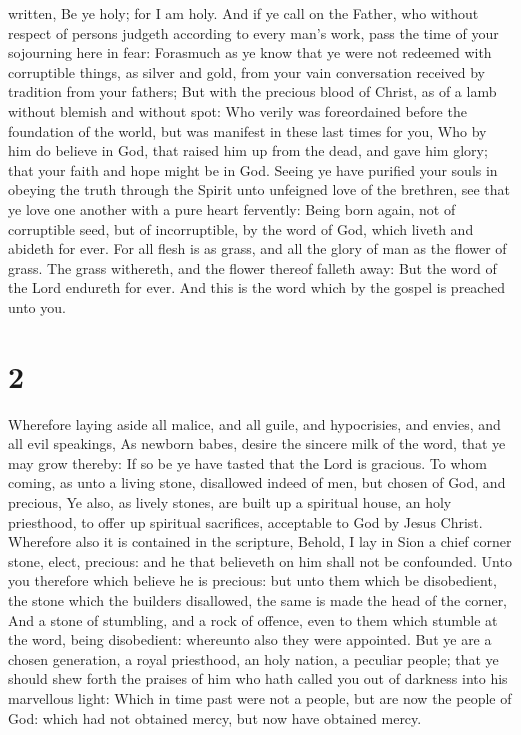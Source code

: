 written, Be ye holy; for I am holy.  And if ye call on the
Father, who without respect of persons judgeth according to every man's
work, pass the time of your sojourning here in fear: 
Forasmuch as ye know that ye were not redeemed with corruptible things,
as silver and gold, from your vain conversation received by tradition
from your fathers;  But with the precious blood of Christ,
as of a lamb without blemish and without spot:  Who verily
was foreordained before the foundation of the world, but was manifest in
these last times for you,  Who by him do believe in God,
that raised him up from the dead, and gave him glory; that your faith
and hope might be in God.  Seeing ye have purified your
souls in obeying the truth through the Spirit unto unfeigned love of the
brethren, see that ye love one another with a pure heart fervently:
 Being born again, not of corruptible seed, but of
incorruptible, by the word of God, which liveth and abideth for ever.
 For all flesh is as grass, and all the glory of man as the
flower of grass. The grass withereth, and the flower thereof falleth
away:  But the word of the Lord endureth for ever. And this
is the word which by the gospel is preached unto you.

\hypertarget{section-1}{%
\section{2}\label{section-1}}

 Wherefore laying aside all malice, and all guile, and
hypocrisies, and envies, and all evil speakings,  As newborn
babes, desire the sincere milk of the word, that ye may grow thereby:
 If so be ye have tasted that the Lord is gracious.
 To whom coming, as unto a living stone, disallowed indeed
of men, but chosen of God, and precious,  Ye also, as lively
stones, are built up a spiritual house, an holy priesthood, to offer up
spiritual sacrifices, acceptable to God by Jesus Christ. 
Wherefore also it is contained in the scripture, Behold, I lay in Sion a
chief corner stone, elect, precious: and he that believeth on him shall
not be confounded.  Unto you therefore which believe he is
precious: but unto them which be disobedient, the stone which the
builders disallowed, the same is made the head of the corner,
 And a stone of stumbling, and a rock of offence, even to
them which stumble at the word, being disobedient: whereunto also they
were appointed.  But ye are a chosen generation, a royal
priesthood, an holy nation, a peculiar people; that ye should shew forth
the praises of him who hath called you out of darkness into his
marvellous light:  Which in time past were not a people,
but are now the people of God: which had not obtained mercy, but now
have obtained mercy.

